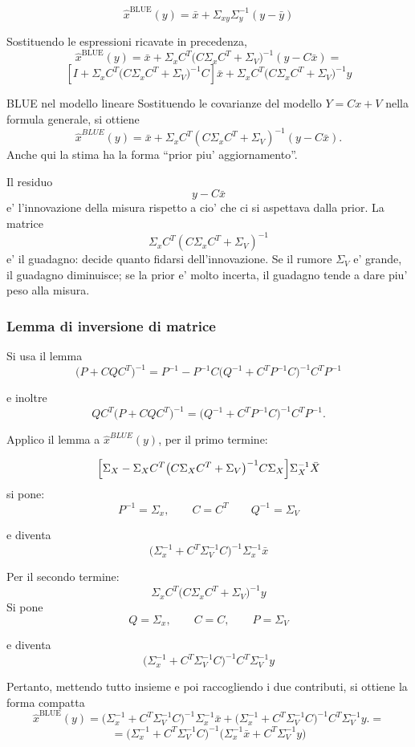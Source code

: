 \documentclass[11pt,a4paper]{article}
\begin{document}
\[
\hat x^{\mathrm{BLUE}}(y)
=
\bar x+\Sigma_{xy}\Sigma_y^{-1}(y-\bar y)
\]

Sostituendo le espressioni ricavate in precedenza,
\[
\hat x^{\mathrm{BLUE}}(y)
=
\bar x+\Sigma_x C^T\bigl(C\Sigma_x C^T+\Sigma_V\bigr)^{-1}(y-C\bar x) = 
\]
\[
[I + \Sigma_x C^T\bigl(C\Sigma_x C^T+\Sigma_V\bigr)^{-1}C]\bar x + \Sigma_x C^T\bigl(C\Sigma_x C^T+\Sigma_V\bigr)^{-1}y
\]

\begin{spiegazione}{BLUE nel modello lineare}
Sostituendo le covarianze del modello $Y=Cx+V$ nella formula generale, si ottiene
\[
\hat x^{BLUE}(y)
=
\bar x+\Sigma_x C^T(C\Sigma_xC^T+\Sigma_V)^{-1}(y-C\bar x).
\]
Anche qui la stima ha la forma ``prior piu' aggiornamento''.

Il residuo
\[
y-C\bar x
\]
e' l'innovazione della misura rispetto a cio' che ci si aspettava dalla prior. La matrice
\[
\Sigma_x C^T(C\Sigma_xC^T+\Sigma_V)^{-1}
\]
e' il guadagno: decide quanto fidarsi dell'innovazione. Se il rumore $\Sigma_V$ e' grande, il guadagno diminuisce; se la prior e' molto incerta, il guadagno tende a dare piu' peso alla misura.
\end{spiegazione}

\subsubsection*{Lemma di inversione di matrice}

Si usa il lemma
\[
\bigl(P+CQC^T\bigr)^{-1}
=
P^{-1}
-
P^{-1}C\bigl(Q^{-1}+C^TP^{-1}C\bigr)^{-1}C^TP^{-1}
\]

e inoltre
\[
QC^T\bigl(P+CQC^T\bigr)^{-1}
=
\bigl(Q^{-1}+C^TP^{-1}C\bigr)^{-1}C^TP^{-1}.
\]

Applico il lemma a $\hat x^{BLUE}(y)$, per il primo termine:

\[
\Bigl[
\Sigma_X-\Sigma_X C^T\bigl(C\Sigma_X C^T+\Sigma_V\bigr)^{-1}C\Sigma_X
\Bigr]\Sigma_X^{-1}\bar X
\]
si pone:
\[
P^{-1}=\Sigma_x,
\qquad
C=C^T
\qquad
Q^{-1} = \Sigma_V
\]

e diventa
\[
\bigl(\Sigma_x^{-1}+C^T\Sigma_V^{-1}C\bigr)^{-1}\Sigma_x^{-1}\bar x
\]

Per il secondo termine:
\[
\Sigma_x C^T\bigl(C\Sigma_x C^T+\Sigma_V\bigr)^{-1}y
\]
Si pone
\[
Q =\Sigma_x, \qquad C = C, \qquad P=\Sigma_V
\]

e diventa
\[
\bigl(\Sigma_x^{-1}+C^T\Sigma_V^{-1}C\bigr)^{-1}C^T\Sigma_V^{-1}y
\]

Pertanto, mettendo tutto insieme e poi raccogliendo i due contributi, si ottiene la forma compatta
\[
\hat x^{\mathrm{BLUE}}(y) = \bigl(\Sigma_x^{-1}+C^T\Sigma_V^{-1}C\bigr)^{-1}\Sigma_x^{-1}\bar x + \bigl(\Sigma_x^{-1}+C^T\Sigma_V^{-1}C\bigr)^{-1}C^T\Sigma_V^{-1}y.
=
\]
\[
=\bigl(\Sigma_x^{-1}+C^T\Sigma_V^{-1}C\bigr)^{-1}
\bigl(\Sigma_x^{-1}\bar x+C^T\Sigma_V^{-1}y\bigr)
\]
\end{document}
